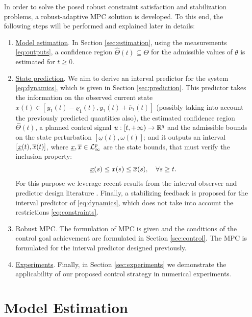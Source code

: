 \documentclass[letterpaper, 10 pt, conference]{ieeeconf}  %
\begin{document}
In order to solve the posed robust constraint satisfaction and stabilization
problems, a robust-adaptive MPC solution \cite{Fukushima2007,Adetola2009,Adetola2011}
is developed. To this end, the following steps will be performed
and explained later in details:
\begin{enumerate}
\item \uline{Model estimation}. In Section \ref{sec:estimation}, using
the measurements \eqref{eq:outputs}, a confidence region $\hat{\Theta}(t)\subseteq\Theta$
for the admissible values of $\theta$ is estimated for $t\geq0$.
\item \uline{State prediction}. We aim to derive an interval predictor
\cite{Dinh2014,leurent2019interval} for the system \eqref{eq:dynamics},
which is given in Section \ref{sec:prediction}. This predictor takes
the information on the observed current state $x(t)\in[y_{1}(t)-\underline{\nu}_{1}(t),y_{1}(t)+\overline{\nu}_{1}(t)]$
(possibly taking into account the previously predicted quantities
also), the estimated confidence region $\hat{\Theta}(t)$, a planned
control signal $u:[t,+\infty)\to\mathbb{R}^{q}$ and the admissible bounds
on the state perturbation $[\underline{\omega}(t),\overline{\omega}(t)]$;
and it outputs an interval $[\underline{x}(t),\overline{x}(t)]$, where $\underline{x},\overline{x}\in\mathcal{L}_{\infty}^{p}$
are the state bounds, that must verify the inclusion property: 
\begin{equation}
\underline{x}(s)\leq x(s)\leq\overline{x}(s),\quad\forall s\geq t.\label{eq:inclusion-generic}
\end{equation}
For this purpose we leverage recent results from the interval observer
and predictor design literature \cite{Dinh2014,leurent2019interval}.
Finally, a stabilizing feedback is proposed for the interval predictor
of \eqref{eq:dynamics}, which does not take into account the restrictions
\eqref{eq:constraints}.
\item \uline{Robust MPC}. The formulation of MPC is given and the conditions
of the control goal achievement are formulated in Section \ref{sec:control}.
The MPC is formulated for the interval predictor designed previously. 
\item \uline{Experiments}. Finally, in Section \ref{sec:experiments}
we demonstrate the applicability of our proposed control strategy
in numerical experiments.
\end{enumerate}

\section{\label{sec:estimation} Model Estimation}
\end{document}
